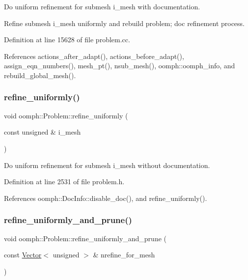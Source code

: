 Do uniform refinement for submesh i\+\_\+mesh with documentation. 

Refine submesh i\+\_\+mesh uniformly and rebuild problem; doc refinement process. 

Definition at line 15628 of file problem.\+cc.



References actions\+\_\+after\+\_\+adapt(), actions\+\_\+before\+\_\+adapt(), assign\+\_\+eqn\+\_\+numbers(), mesh\+\_\+pt(), nsub\+\_\+mesh(), oomph\+::oomph\+\_\+info, and rebuild\+\_\+global\+\_\+mesh().

\mbox{\label{classoomph_1_1Problem_afae401b74b58d6312da32f153b78047d}} 
\subsubsection{\texorpdfstring{refine\+\_\+uniformly()}{refine\_uniformly()}\hspace{0.1cm}{\footnotesize\ttfamily [6/6]}}
{\footnotesize\ttfamily void oomph\+::\+Problem\+::refine\+\_\+uniformly (\begin{DoxyParamCaption}\item[{const unsigned \&}]{i\+\_\+mesh }\end{DoxyParamCaption})\hspace{0.3cm}{\ttfamily [inline]}}



Do uniform refinement for submesh i\+\_\+mesh without documentation. 



Definition at line 2531 of file problem.\+h.



References oomph\+::\+Doc\+Info\+::disable\+\_\+doc(), and refine\+\_\+uniformly().

\mbox{\label{classoomph_1_1Problem_a3930fc0977bdc33f52100e53f5d878d7}} 
\subsubsection{\texorpdfstring{refine\+\_\+uniformly\+\_\+and\+\_\+prune()}{refine\_uniformly\_and\_prune()}\hspace{0.1cm}{\footnotesize\ttfamily [1/3]}}
{\footnotesize\ttfamily void oomph\+::\+Problem\+::refine\+\_\+uniformly\+\_\+and\+\_\+prune (\begin{DoxyParamCaption}\item[{const \hyperlink{classoomph_1_1Vector}{Vector}$<$ unsigned $>$ \&}]{nrefine\+\_\+for\+\_\+mesh }\end{DoxyParamCaption})\hspace{0.3cm}{\ttfamily [inline]}}



